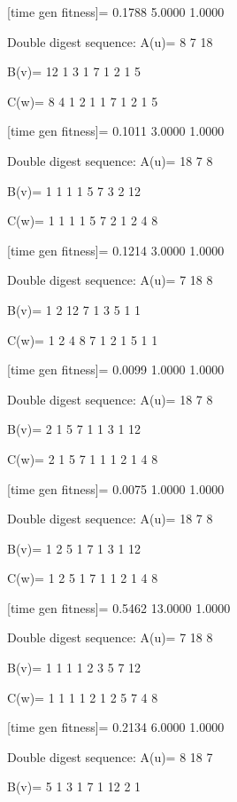 [time gen fitness]=
    0.1788    5.0000    1.0000

Double digest sequence:
A(u)=
     8     7    18

B(v)=
    12     1     3     1     7     1     2     1     5

C(w)=
     8     4     1     2     1     1     7     1     2     1     5

[time gen fitness]=
    0.1011    3.0000    1.0000

Double digest sequence:
A(u)=
    18     7     8

B(v)=
     1     1     1     1     5     7     3     2    12

C(w)=
     1     1     1     1     5     7     2     1     2     4     8

[time gen fitness]=
    0.1214    3.0000    1.0000

Double digest sequence:
A(u)=
     7    18     8

B(v)=
     1     2    12     7     1     3     5     1     1

C(w)=
     1     2     4     8     7     1     2     1     5     1     1

[time gen fitness]=
    0.0099    1.0000    1.0000

Double digest sequence:
A(u)=
    18     7     8

B(v)=
     2     1     5     7     1     1     3     1    12

C(w)=
     2     1     5     7     1     1     1     2     1     4     8

[time gen fitness]=
    0.0075    1.0000    1.0000

Double digest sequence:
A(u)=
    18     7     8

B(v)=
     1     2     5     1     7     1     3     1    12

C(w)=
     1     2     5     1     7     1     1     2     1     4     8

[time gen fitness]=
    0.5462   13.0000    1.0000

Double digest sequence:
A(u)=
     7    18     8

B(v)=
     1     1     1     1     2     3     5     7    12

C(w)=
     1     1     1     1     2     1     2     5     7     4     8

[time gen fitness]=
    0.2134    6.0000    1.0000

Double digest sequence:
A(u)=
     8    18     7

B(v)=
     5     1     3     1     7     1    12     2     1

